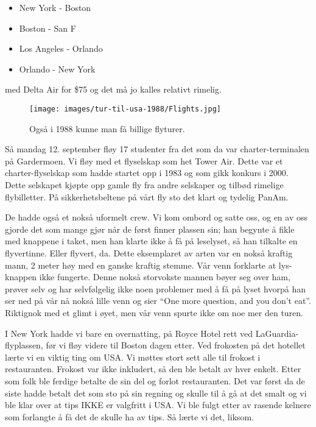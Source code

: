 \begin{itemize}
	\item New York - Boston
	\item Boston - San F
	\item Los Angeles - Orlando
	\item Orlando - New York
\end{itemize}

med Delta Air for \$75 og det må jo kalles relativt rimelig.

\begin{figure}
	\texttt{[image: images/tur-til-usa-1988/Flights.jpg]}
	\caption{Også i 1988 kunne man få billige flyturer.}
\end{figure}

Så mandag 12. september fløy 17 studenter fra det som da var charter-terminalen på Gardermoen. Vi fløy med et flyselskap som het Tower Air. Dette var et charter-flyselskap som hadde startet opp i 1983 og som gikk konkurs i 2000. Dette selskapet kjøpte opp gamle fly fra andre selskaper og tilbød rimelige flybilletter. På sikkerhetsbeltene på vårt fly sto det klart og tydelig PanAm.

De hadde også et nokså uformelt crew. Vi kom ombord og satte oss, og en av oss gjorde det som mange gjør når de først finner plassen sin; han begynte å fikle med knappene i taket, men han klarte ikke å få på leselyset, så han tilkalte en flyvertinne. Eller flyvert, da. Dette eksemplaret av arten var en nokså kraftig mann, 2 meter høy med en ganske kraftig stemme. Vår venn forklarte at lys-knappen ikke fungerte. Denne nokså storvokste mannen bøyer seg over ham, prøver selv og har selvfølgelig ikke noen problemer med å få på lyset hvorpå han ser ned på vår nå nokså lille venn og sier “One more question, and you don’t eat”. Riktignok med et glimt i øyet, men vår venn spurte ikke om noe mer den turen.

I New York hadde vi bare en overnatting, på Royce Hotel rett ved LaGuardia-flyplassen, før vi fløy videre til Boston dagen etter. Ved frokosten på det hotellet lærte vi en viktig ting om USA. Vi møttes stort sett alle til frokost i restauranten. Frokost var ikke inkludert, så den ble betalt av hver enkelt. Etter som folk ble ferdige betalte de sin del og forlot restauranten. Det var først da de siste hadde betalt det som sto på sin regning og skulle til å gå at det smalt og vi ble klar over at tips IKKE er valgfritt i USA. Vi ble fulgt etter av rasende kelnere som forlangte å få det de skulle ha av tips. Så lærte vi det, liksom.

